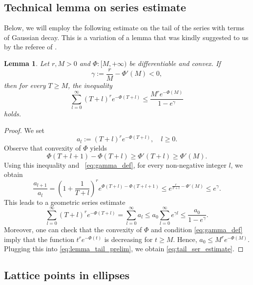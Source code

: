 \documentclass[11pt]{amsart}
\numberwithin{equation}{section}
\newtheorem{lemma}[theorem]{Lemma}
\begin{document}
\subsection{Technical lemma on series estimate}

Below, we will employ the following estimate on the tail of the series with terms of Gaussian decay. This is a variation of a lemma that was kindly suggested to us by the referee of \cite{MR4887696}.
\begin{lemma}\label{lem:tail_estimate}
    Let $ r, M > 0$ and $\Phi:[M,+\infty)$ be differentiable and convex.  If
    \begin{equation}\label{eq:gamma_def}
        \gamma:=\frac{r}{M} -\Phi'(M)<0,
    \end{equation}
    then for every $T \ge M$, the inequality
    \begin{equation}\label{eq:tail_ser_estimate}
        \sum\limits_{l = 0}^{\infty} (T+l)^r e^{-\Phi(T+l)} \leq \frac{M^r e^{-\Phi( M)}}{1-e^{\gamma}}
    \end{equation}
    holds.
\end{lemma}

\begin{proof}
We set
$$
a_l:=(T+l)^{r}e^{-\Phi(T+l)},\quad l\geq 0.
$$
Observe that convexity of $\Phi$ yields
\begin{equation}
    \Phi(T+l+1) - \Phi(T+l) \geq \Phi'(T+l) \geq \Phi'(M).
\end{equation}
Using this inequality and ~\eqref{eq:gamma_def}, for every non-negative integer $l$, we obtain
\begin{equation}
\frac{a_{l+1}}{a_l} = \left(1+\frac{1}{T+l}\right)^{r} 
e^{\Phi(T+l) - \Phi(T+l+1)}
\leq e^{\frac{r}{T+l} - \Phi'(M)} \leq e^{\gamma}.
\end{equation}
This leads to a geometric series estimate
\begin{equation}\label{eq:lemma_tail_prelim}
        \sum\limits_{l=0}^{\infty} (T+l)^r e^{-\Phi(T+l) } = \sum\limits_{l=0}^{\infty} a_l \leq a_0 \sum\limits_{l=0}^{\infty} e^{\gamma l}  \leq \frac{a_0}{1-e^{\gamma}}.
\end{equation}
Moreover, one can check that the convexity of $\Phi$ and condition \eqref{eq:gamma_def} imply that the function $t^r e^{-\Phi( t)}$ is decreasing for $t \geq M$. Hence, $a_0 \leq M^r e^{-\Phi(M)}$. Plugging this into \eqref{eq:lemma_tail_prelim}, we obtain \eqref{eq:tail_ser_estimate}.
\end{proof}

\subsection{Lattice points in ellipses}
\end{document}
